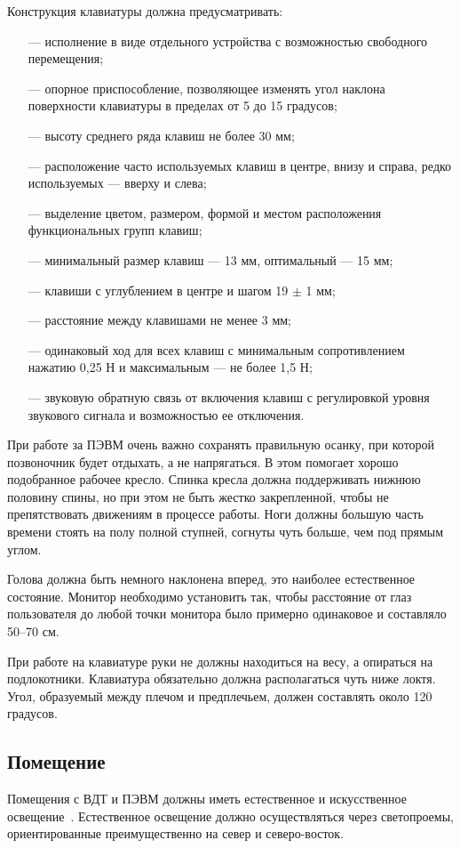 Конструкция клавиатуры должна предусматривать:
\begin{itemize}
\item[---] исполнение в виде отдельного устройства с возможностью свободного перемещения;
\item[---] опорное приспособление, позволяющее изменять угол наклона поверхности клавиатуры в пределах от 5 до 15 градусов;
\item[---] высоту среднего ряда клавиш не более 30 мм;
\item[---] расположение часто используемых клавиш в центре, внизу и справа, редко используемых --- вверху и слева;
\item[---] выделение цветом, размером, формой и местом расположения функциональных групп клавиш;
\item[---] минимальный размер клавиш --- 13 мм, оптимальный --- 15 мм;
\item[---] клавиши с углублением в центре и шагом 19 $\pm$ 1 мм;
\item[---] расстояние между клавишами не менее 3 мм;
\item[---] одинаковый ход для всех клавиш с минимальным сопротивлением нажатию 0,25 Н и максимальным --- не более 1,5 Н;
\item[---] звуковую обратную связь от включения клавиш с регулировкой уровня звукового сигнала и возможностью ее отключения.
\end{itemize}

При работе за ПЭВМ очень важно сохранять правильную осанку, при которой позвоночник будет отдыхать, а не напрягаться. В этом помогает хорошо подобранное рабочее кресло. Спинка кресла должна поддерживать нижнюю половину спины, но при этом не быть жестко закрепленной, чтобы не препятствовать движениям в процессе работы. Ноги должны большую часть времени стоять на полу полной ступней, согнуты чуть больше, чем под прямым углом.

Голова должна быть немного наклонена вперед, это наиболее естественное состояние. Монитор необходимо установить так, чтобы расстояние от глаз пользователя до любой точки монитора было примерно одинаковое и составляло 50--70 см.

При работе на клавиатуре руки не должны находиться на весу, а опираться на подлокотники. Клавиатура обязательно должна располагаться чуть ниже локтя. Угол, образуемый между плечом и предплечьем, должен составлять около 120 градусов.

\subsection{Помещение}
\label{sec:bgd:pomeschenie}
 Помещения с ВДТ и ПЭВМ должны иметь естественное и искусственное освещение~\cite{BGDGigi2004}. Естественное освещение должно осуществляться через светопроемы, ориентированные преимущественно на север и северо-восток.\par{}

